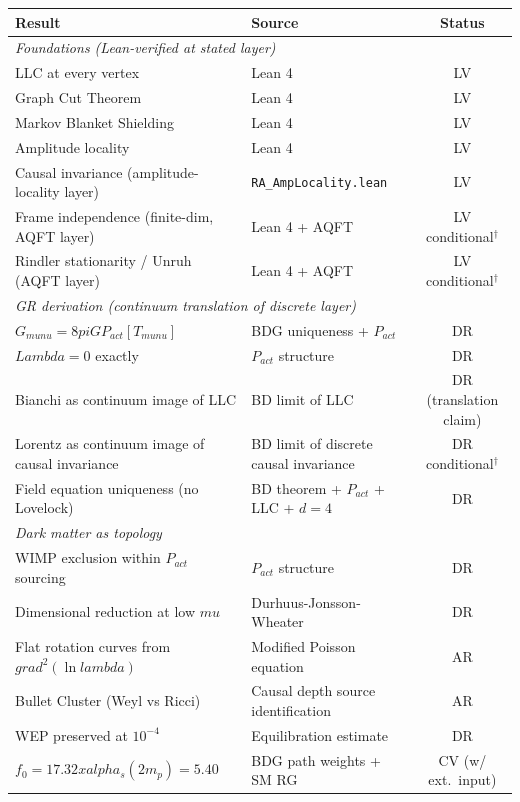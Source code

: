 \documentclass[11pt]{article}
\def\Lambda{Lambda}%
\def\mu{mu}%
\def\alpha{alpha}%
\def\lambda{lambda}%
\def\nu{nu}%
\def\pi{pi}%
\def\mathrm#1{#1}%
\def\times{x}%
\def\nabla{grad}%
\begin{document}
\begin{center}
\begin{tabular}{llc}
\toprule
Result & Source & Status \\
\midrule
\multicolumn{3}{l}{\textit{Foundations (Lean-verified at stated layer)}} \\
LLC at every vertex & Lean 4 & LV \\
Graph Cut Theorem & Lean 4 & LV \\
Markov Blanket Shielding & Lean 4 & LV \\
Amplitude locality & Lean 4 & LV \\
Causal invariance (amplitude-locality layer) & \texttt{RA\_AmpLocality.lean} & LV \\
Frame independence (finite-dim, AQFT layer) & Lean 4 + AQFT & LV conditional$^\dagger$ \\
Rindler stationarity / Unruh (AQFT layer) & Lean 4 + AQFT & LV conditional$^\dagger$ \\
\midrule
\multicolumn{3}{l}{\textit{GR derivation (continuum translation of discrete layer)}} \\
$G_{\mu\nu}=8\pi G P_{\mathrm{act}}[T_{\mu\nu}]$ & BDG uniqueness + $P_{\mathrm{act}}$ & DR \\
$\Lambda=0$ exactly & $P_{\mathrm{act}}$ structure & DR \\
Bianchi as continuum image of LLC & BD limit of LLC & DR (translation claim) \\
Lorentz as continuum image of causal invariance & BD limit of discrete causal invariance & DR conditional$^\dagger$ \\
Field equation uniqueness (no Lovelock) & BD theorem + $P_{\mathrm{act}}$ + LLC + $d{=}4$ & DR \\
\midrule
\multicolumn{3}{l}{\textit{Dark matter as topology}} \\
WIMP exclusion within $P_{\mathrm{act}}$ sourcing & $P_{\mathrm{act}}$ structure & DR \\
Dimensional reduction at low $\mu$ & Durhuus-Jonsson-Wheater & DR \\
Flat rotation curves from $\nabla^2(\ln\lambda)$ & Modified Poisson equation & AR \\
Bullet Cluster (Weyl vs Ricci) & Causal depth source identification & AR \\
WEP preserved at $10^{-4}$ & Equilibration estimate & DR \\
$f_0=17.32\times\alpha_s(2m_p)=5.40$ & BDG path weights + SM RG & CV (w/ ext.\ input) \\

\end{tabular}
\end{center}
\end{document}
